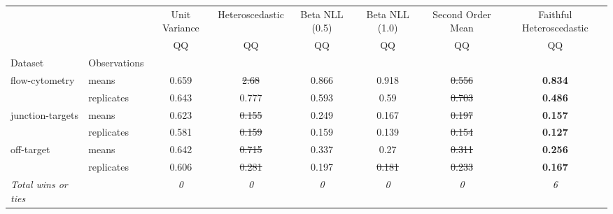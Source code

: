 \begin{tabular}{ll|c|c|c|c|c|c}
\toprule
{} & {} & {Unit Variance} & {Heteroscedastic} & {Beta NLL (0.5)} & {Beta NLL (1.0)} & {Second Order Mean} & {Faithful Heteroscedastic} \\
{} & {} & {QQ} & {QQ} & {QQ} & {QQ} & {QQ} & {QQ} \\
{Dataset} & {Observations} & {} & {} & {} & {} & {} & {} \\
\midrule
\multirow[t]{2}{*}{flow-cytometry} & means & 0.659 & \sout{2.68} & 0.866 & 0.918 & \sout{0.556} & \textbf{0.834} \\
 & replicates & 0.643 & 0.777 & 0.593 & 0.59 & \sout{0.703} & \textbf{0.486} \\
\multirow[t]{2}{*}{junction-targets} & means & 0.623 & \sout{0.155} & 0.249 & 0.167 & \sout{0.197} & \textbf{0.157} \\
 & replicates & 0.581 & \sout{0.159} & 0.159 & 0.139 & \sout{0.154} & \textbf{0.127} \\
\multirow[t]{2}{*}{off-target} & means & 0.642 & \sout{0.715} & 0.337 & 0.27 & \sout{0.311} & \textbf{0.256} \\
 & replicates & 0.606 & \sout{0.281} & 0.197 & \sout{0.181} & \sout{0.233} & \textbf{0.167} \\
\textit{{Total wins or ties}} &  & \textit{0} & \textit{0} & \textit{0} & \textit{0} & \textit{0} & \textit{6} \\
\bottomrule
\end{tabular}
